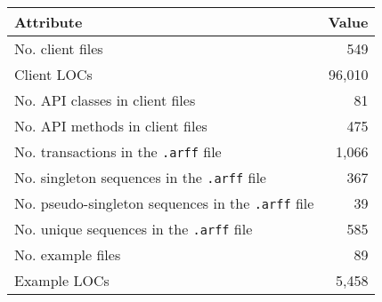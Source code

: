 \begin{tabular}{lr}
\toprule
Attribute & Value \\
\midrule
No. client files & 549 \\
Client LOCs & 96,010 \\
No. API classes in client files & 81 \\
No. API methods in client files & 475 \\
No. transactions in the \texttt{.arff} file & 1,066 \\
No. singleton sequences in the \texttt{.arff} file & 367 \\
No. pseudo-singleton sequences in the \texttt{.arff} file & 39 \\
No. unique sequences in the \texttt{.arff} file & 585 \\
No. example files & 89 \\
Example LOCs & 5,458 \\
\bottomrule
\end{tabular}